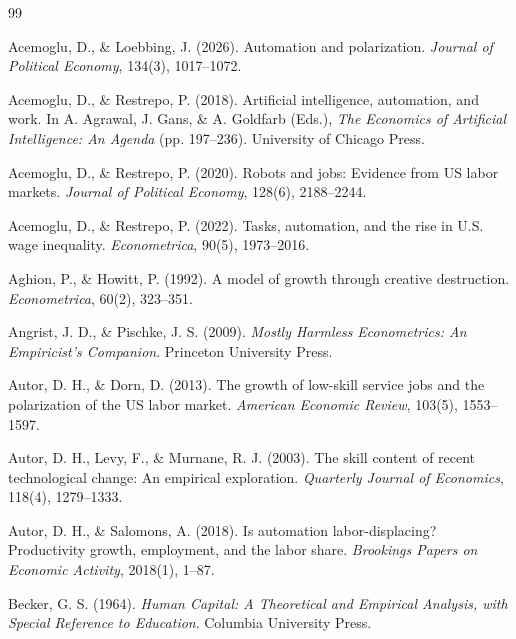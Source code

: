 \documentclass[12pt,a4paper]{article}
\theoremstyle{predstyle}
\theoremstyle{plain}
\begin{document}

\begin{thebibliography}{99}

Acemoglu, D., \& Loebbing, J. (2026). Automation and polarization. \textit{Journal of Political Economy}, 134(3), 1017--1072.

Acemoglu, D., \& Restrepo, P. (2018). Artificial intelligence, automation, and work. In A. Agrawal, J. Gans, \& A. Goldfarb (Eds.), \textit{The Economics of Artificial Intelligence: An Agenda} (pp. 197--236). University of Chicago Press.

Acemoglu, D., \& Restrepo, P. (2020). Robots and jobs: Evidence from US labor markets. \textit{Journal of Political Economy}, 128(6), 2188--2244.

Acemoglu, D., \& Restrepo, P. (2022). Tasks, automation, and the rise in U.S. wage inequality. \textit{Econometrica}, 90(5), 1973--2016.

Aghion, P., \& Howitt, P. (1992). A model of growth through creative destruction. \textit{Econometrica}, 60(2), 323--351.

Angrist, J. D., \& Pischke, J. S. (2009). \textit{Mostly Harmless Econometrics: An Empiricist's Companion}. Princeton University Press.

Autor, D. H., \& Dorn, D. (2013). The growth of low-skill service jobs and the polarization of the US labor market. \textit{American Economic Review}, 103(5), 1553--1597.

Autor, D. H., Levy, F., \& Murnane, R. J. (2003). The skill content of recent technological change: An empirical exploration. \textit{Quarterly Journal of Economics}, 118(4), 1279--1333.

Autor, D. H., \& Salomons, A. (2018). Is automation labor-displacing? Productivity growth, employment, and the labor share. \textit{Brookings Papers on Economic Activity}, 2018(1), 1--87.

Becker, G. S. (1964). \textit{Human Capital: A Theoretical and Empirical Analysis, with Special Reference to Education}. Columbia University Press.


\end{thebibliography}
\end{document}
